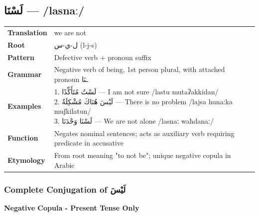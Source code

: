 \documentclass[letterpaper,12pt]{article}
\begin{document}
\subsection{\textarabic{لَسْنَا} — /lasnaː/}
\begin{tabular}{p{3cm}p{10cm}}
\toprule
\textbf{Translation} & we are not \\
\textbf{Root} & \textarabic{ل-ي-س} (l-j-s) \\
\textbf{Pattern} & Defective verb + pronoun suffix \\
\textbf{Grammar} & Negative verb of being, 1st person plural, with attached pronoun \textarabic{ـنَا} \\
\midrule
\textbf{Examples} & \makecell[l]{\parbox{9.5cm}{
1. \textarabic{لَسْتُ مُتَأَكِّدًا} — I am not sure /lastu mutaʔakkidan/\\
2. \textarabic{لَيْسَ هُنَاكَ مُشْكِلَةٌ} — There is no problem /lajsa hunaːka muʃkilatun/\\
3. \textarabic{لَسْنَا وَحْدَنَا} — We are not alone /lasnaː waħdanaː/
}} \\
\midrule
\textbf{Function} & Negates nominal sentences; acts as auxiliary verb requiring predicate in accusative \\
\textbf{Etymology} & From root meaning "to not be"; unique negative copula in Arabic \\
\bottomrule
\end{tabular}

\subsubsection*{Complete Conjugation of \textarabic{لَيْسَ}}
\par{\large \textbf{Negative Copula - Present Tense Only}}
\end{document}
